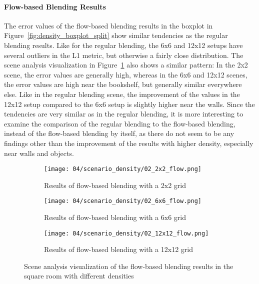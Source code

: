 \paragraph{Flow-based Blending Results}
The error values of the flow-based blending results in the boxplot in Figure~\ref{fig:density_boxplot_split} show similar tendencies as the regular blending results. Like for the regular blending, the 6x6 and 12x12 setups have several outliers in the L1 metric, but otherwise a fairly close distribution. The scene analysis visualization in Figure~\ref{fig:density_flow_scene_analysis} also shows a similar pattern: In the 2x2 scene, the error values are generally high, whereas in the 6x6 and 12x12 scenes, the error values are high near the bookshelf, but generally similar everywhere else. Like in the regular blending scene, the improvement of the values in the 12x12 setup compared to the 6x6 setup is slightly higher near the walls. Since the tendencies are very similar as in the regular blending, it is more interesting to examine the comparison of the regular blending to the flow-based blending, instead of the flow-based blending by itself, as there do not seem to be any findings other than the improvement of the results with higher density, especially near walls and objects.

\begin{figure}
\centering
    \hfill
    \begin{subfigure}[b]{0.32\textwidth}
            \centering
            \texttt{[image: 04/scenario\_density/02\_2x2\_flow.png]}
            \caption{Results of flow-based blending with a 2x2 grid}
    \end{subfigure}
    \hfill
    \begin{subfigure}[b]{0.32\textwidth}
            \centering
            \texttt{[image: 04/scenario\_density/02\_6x6\_flow.png]}
            \caption{Results of flow-based blending with a 6x6 grid}
    \end{subfigure}
    \hfill
    \begin{subfigure}[b]{0.32\textwidth}
            \centering
            \texttt{[image: 04/scenario\_density/02\_12x12\_flow.png]}
            \caption{Results of flow-based blending with a 12x12 grid}
    \end{subfigure}
    \hfill
  \caption{Scene analysis visualization of the flow-based blending results in the square room with different densities} \label{fig:density_flow_scene_analysis}
\end{figure}


